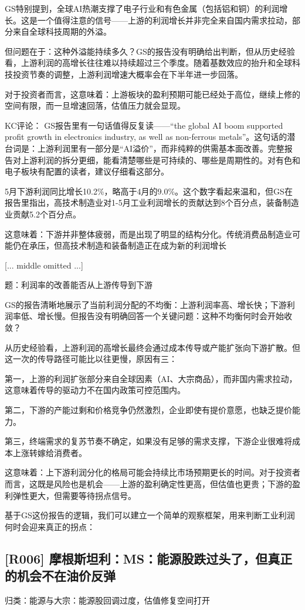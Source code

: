 \documentclass[11pt]{ctexart}
\begin{document}
GS特别提到，全球AI热潮支撑了电子行业和有色金属（包括铝和铜）的利润增长。这是一个值得注意的信号——上游的利润增长并非完全来自国内需求拉动，部分来自全球科技周期的外溢。

但问题在于：这种外溢能持续多久？GS的报告没有明确给出判断，但从历史经验看，上游利润的高增长往往难以持续超过三个季度。随着基数效应的抬升和全球科技投资节奏的调整，上游利润增速大概率会在下半年进一步回落。

对于投资者而言，这意味着：上游板块的盈利预期可能已经处于高位，继续上修的空间有限，而一旦增速回落，估值压力就会显现。

KC评论： GS报告里有一句话值得反复读——“the global AI boom supported profit growth in electronics industry, as well as non-ferrous metals”。这句话的潜台词是：上游利润里有一部分是“AI溢价”，而非纯粹的供需基本面改善。完整报告对上游利润的拆分更细，能看清楚哪些是可持续的、哪些是周期性的。对有色和电子板块有配置的读者，建议仔细看这部分。

5月下游利润同比增长10.2\%，略高于4月的9.0\%。这个数字看起来温和，但GS在报告里指出，高技术制造业对1-5月工业利润增长的贡献达到8个百分点，装备制造业贡献5.2个百分点。

这意味着：下游并非整体疲弱，而是出现了明显的结构分化。传统消费品制造业可能仍在承压，但高技术制造和装备制造正在成为新的利润增长

[... middle omitted ...]

题：利润率的改善能否从上游传导到下游

GS的报告清晰地展示了当前利润分配的不均衡：上游利润率高、增长快；下游利润率低、增长慢。但报告没有明确回答一个关键问题：这种不均衡何时会开始收敛？

从历史经验看，上游利润的高增长最终会通过成本传导或产能扩张向下游扩散。但这一次的传导路径可能比以往更慢，原因有三：

第一，上游的利润扩张部分来自全球因素（AI、大宗商品），而非国内需求拉动，这意味着传导的驱动力不在国内政策可控范围内。

第二，下游的产能过剩和价格竞争仍然激烈，企业即使有提价意愿，也缺乏提价能力。

第三，终端需求的复苏节奏不确定，如果没有足够的需求支撑，下游企业很难将成本上涨转嫁给消费者。

这意味着：上下游利润分化的格局可能会持续比市场预期更长的时间。对于投资者而言，这既是风险也是机会——上游的盈利确定性更高，但估值也更贵；下游的盈利弹性更大，但需要等待拐点信号。

基于GS这份报告的逻辑，我们可以建立一个简单的观察框架，用来判断工业利润何时会迎来真正的拐点：

\subsection{[R006] 摩根斯坦利：MS：能源股跌过头了，但真正的机会不在油价反弹}
{\small\color{refgray}归类：能源与大宗：能源股回调过度，估值修复空间打开}
\end{document}
